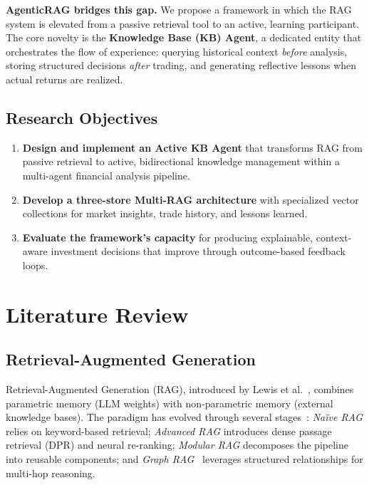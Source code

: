 \documentclass[conference]{IEEEtran}
\begin{document}
\textbf{AgenticRAG bridges this gap.} We propose a framework in which the RAG system is elevated from a passive retrieval tool to an active, learning participant. The core novelty is the \textbf{Knowledge Base (KB) Agent}, a dedicated entity that orchestrates the flow of experience: querying historical context \textit{before} analysis, storing structured decisions \textit{after} trading, and generating reflective lessons when actual returns are realized.

\subsection{Research Objectives}

\begin{enumerate}
\item \textbf{Design and implement an Active KB Agent} that transforms RAG from passive retrieval to active, bidirectional knowledge management within a multi-agent financial analysis pipeline.
\item \textbf{Develop a three-store Multi-RAG architecture} with specialized vector collections for market insights, trade history, and lessons learned.
\item \textbf{Evaluate the framework's capacity} for producing explainable, context-aware investment decisions that improve through outcome-based feedback loops.
\end{enumerate}

\section{Literature Review}

\subsection{Retrieval-Augmented Generation}

Retrieval-Augmented Generation (RAG), introduced by Lewis et al.~\cite{lewis2020rag}, combines parametric memory (LLM weights) with non-parametric memory (external knowledge bases). The paradigm has evolved through several stages~\cite{gao2024ragsurvey}: \textit{Na\"ive RAG} relies on keyword-based retrieval; \textit{Advanced RAG} introduces dense passage retrieval (DPR) and neural re-ranking; \textit{Modular RAG} decomposes the pipeline into reusable components; and \textit{Graph RAG}~\cite{peng2024graphrag} leverages structured relationships for multi-hop reasoning.
\end{document}
